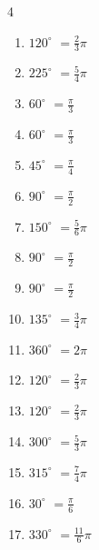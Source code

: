 \begin{multicols}{4}
\begin{enumerate}
  \item $\displaystyle 120^{\circ}$
        $\displaystyle =\frac{2}{3}\pi$

  \item $\displaystyle 225^{\circ}$
        $\displaystyle =\frac{5}{4}\pi$

  \item $\displaystyle 60^{\circ}$
        $\displaystyle =\frac{\pi}{3}$

  \item $\displaystyle 60^{\circ}$
        $\displaystyle =\frac{\pi}{3}$

  \item $\displaystyle 45^{\circ}$
        $\displaystyle =\frac{\pi}{4}$

  \item $\displaystyle 90^{\circ}$
        $\displaystyle =\frac{\pi}{2}$

  \item $\displaystyle 150^{\circ}$
        $\displaystyle =\frac{5}{6}\pi$

  \item $\displaystyle 90^{\circ}$
        $\displaystyle =\frac{\pi}{2}$

  \item $\displaystyle 90^{\circ}$
        $\displaystyle =\frac{\pi}{2}$

  \item $\displaystyle 135^{\circ}$
        $\displaystyle =\frac{3}{4}\pi$

  \item $\displaystyle 360^{\circ}$
        $\displaystyle =2\pi$

  \item $\displaystyle 120^{\circ}$
        $\displaystyle =\frac{2}{3}\pi$

  \item $\displaystyle 120^{\circ}$
        $\displaystyle =\frac{2}{3}\pi$

  \item $\displaystyle 300^{\circ}$
        $\displaystyle =\frac{5}{3}\pi$

  \item $\displaystyle 315^{\circ}$
        $\displaystyle =\frac{7}{4}\pi$

  \item $\displaystyle 30^{\circ}$
        $\displaystyle =\frac{\pi}{6}$

  \item $\displaystyle 330^{\circ}$
        $\displaystyle =\frac{11}{6}\pi$


\end{enumerate}
\end{multicols}
